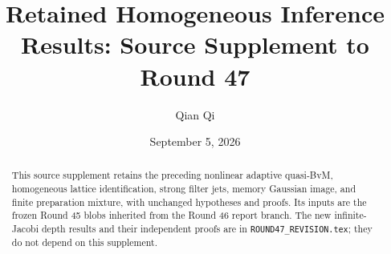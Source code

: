 \documentclass[11pt,reqno]{amsart}
\title{Retained Homogeneous Inference Results: Source Supplement to Round 47}
\author{Qian Qi}
\date{September 5, 2026}
\begin{document}
\begin{abstract}
This source supplement retains the preceding nonlinear adaptive quasi-BvM,
homogeneous lattice identification, strong filter jets, memory Gaussian image,
and finite preparation mixture, with unchanged hypotheses and proofs. Its
inputs are the frozen Round 45 blobs inherited from the Round 46 report branch.
The new infinite-Jacobi depth results and their independent proofs are in
\texttt{ROUND47\_REVISION.tex}; they do not depend on this supplement.
\end{abstract}
\maketitle\tableofcontents




\end{document}
